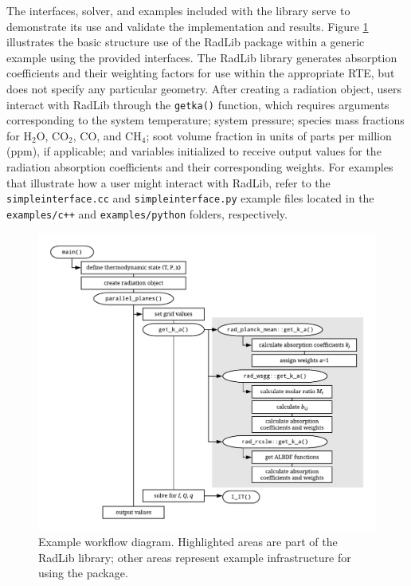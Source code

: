 \documentclass[preprint,12pt]{elsarticle}
\begin{document}
The interfaces, solver, and examples included with the library serve to demonstrate its use and validate the implementation and results. Figure \ref{fig:flowchart} illustrates the basic structure use of the RadLib package within a generic example using the provided interfaces. The RadLib library generates absorption coefficients and their weighting factors for use within the appropriate RTE, but does not specify any particular geometry. After creating a radiation object, users interact with RadLib through the \texttt{get\textunderscore k\textunderscore a()} function, which requires arguments corresponding to the system temperature; system pressure; species mass fractions for H$_2$O, CO$_2$, CO, and CH$_4$; soot volume fraction in units of parts per million (ppm), if applicable; and variables initialized to receive output values for the radiation absorption coefficients and their corresponding weights. For examples that illustrate how a user might interact with RadLib, refer to the \texttt{simple\textunderscore interface.cc} and \texttt{simple\textunderscore interface.py} example files located in the \texttt{examples/c++} and \texttt{examples/python} folders, respectively. 
%
\begin{figure}
	\begin{center}
        \includegraphics[width=\textwidth]{fig_radlib_structure.pdf}
	\end{center}
	\caption{Example workflow diagram. Highlighted areas are part of the RadLib library; other areas represent example infrastructure for using the package.}
\label{fig:flowchart}
\end{figure}
%
\end{document}
